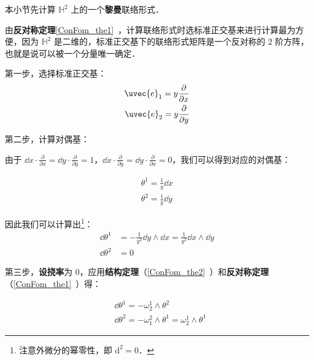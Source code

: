 
本小节先计算 $\mathbb{H}^2$ 上的一个\textbf{黎曼}联络形式．

由\textbf{反对称定理}\autoref{ConFom_the1}~，计算联络形式时选标准正交基来进行计算最为方便，因为 $\mathbb{H}^2$ 是二维的，标准正交基下的联络形式矩阵是一个反对称的 $2$ 阶方阵，也就是说可以被一个分量唯一确定．

第一步，选择标准正交基：
\begin{equation}
\begin{aligned}
\uvec{e}_1=y\frac{\partial}{\partial x}\\
\uvec{e}_2=y\frac{\partial}{\partial y}
\end{aligned}
\end{equation}

第二步，计算对偶基：

由于 $\dd x\cdot \frac{\partial }{\partial x}=\dd y\cdot \frac{\partial}{\partial y}=1$，$\dd x\cdot \frac{\partial }{\partial y}=\dd y\cdot \frac{\partial}{\partial x}=0$，我们可以得到对应的对偶基：

\begin{equation}\label{PoiHP_eq1}
\begin{aligned}
\theta^1=\frac{1}{y}\dd x\\
\theta^2=\frac{1}{y}\dd y
\end{aligned}
\end{equation}

因此我们可以计算出\footnote{注意外微分的幂零性，即 $\mathrm{d}^2=0$．}：
\begin{equation}\label{PoiHP_eq2}
\begin{aligned}
\dd\theta^1&=-\frac{1}{y^2}\dd y\wedge\dd x=\frac{1}{y^2}\dd x\wedge \dd y\\
\dd\theta^2&=0
\end{aligned}
\end{equation}

第三步，\textbf{设挠率}为 $0$，应用\textbf{结构定理}（\autoref{ConFom_the2}~）和\textbf{反对称定理}（\autoref{ConFom_the1}~）得：

\begin{equation}\label{PoiHP_eq3}
\begin{aligned}
&\dd\theta^1=-\omega^1_2\wedge\theta^2\\
&\dd\theta^2=-\omega^2_1\wedge\theta^1=\omega^1_2\wedge\theta^1
\end{aligned}
\end{equation}



